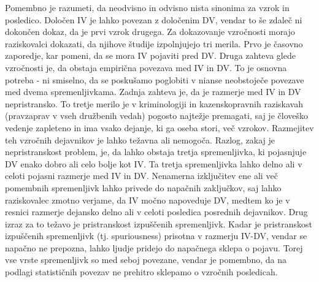 \documentclass[12pt,a4paper]{amsart}
\theoremstyle{definition} %
\theoremstyle{plain} %
\begin{document}
Pomembno je razumeti, da neodvisno in odvisno nista sinonima za vzrok in posledico. Določen IV je lahko povezan z določenim DV, vendar to še 
zdaleč ni dokončen dokaz, da je prvi vzrok drugega. Za dokazovanje vzročnosti morajo raziskovalci dokazati, da njihove študije izpolnjujejo 
tri merila. Prvo je časovno zaporedje, kar pomeni, da se mora IV pojaviti pred DV. Druga zahteva glede vzročnosti je, da obstaja empirična 
povezava med IV in DV. To je osnovna potreba - ni smiselno, da se poskušamo poglobiti v nianse neobstoječe povezave med dvema spremenljivkama. 
Zadnja zahteva je, da je razmerje med IV in DV nepristransko. To tretje merilo je v kriminologiji in kazenskopravnih raziskavah (pravzaprav v vseh 
družbenih vedah) pogosto najtežje premagati, saj je človeško vedenje zapleteno in ima vsako dejanje, ki ga oseba stori, več vzrokov. Razmejitev 
teh vzročnih dejavnikov je lahko težavna ali nemogoča. Razlog, zakaj je nepristranskost problem, je, da lahko obstaja tretja spremenljivka, 
ki pojasnjuje DV enako dobro ali celo bolje kot IV. Ta tretja spremenljivka lahko delno ali v celoti pojasni razmerje med IV in DV. Nenamerna 
izključitev ene ali več pomembnih spremenljivk lahko privede do napačnih zaključkov, saj lahko raziskovalec zmotno verjame, da IV močno 
napoveduje DV, medtem ko je v resnici razmerje dejansko delno ali v celoti posledica posrednih dejavnikov. Drug izraz za to težavo je 
pristranskost izpuščenih spremenljivk. Kadar je pristranskost izpuščenih spremenljivk (tj. spuriousness) prisotna v razmerju IV-DV, vendar 
se napačno ne prepozna, lahko ljudje pridejo do napačnega sklepa o pojavu. Torej vse vrste spremenljivk so med seboj povezane, vendar je 
pomembno, da na podlagi statističnih povezav ne prehitro sklepamo o vzročnih posledicah.\\\\

\end{document}
